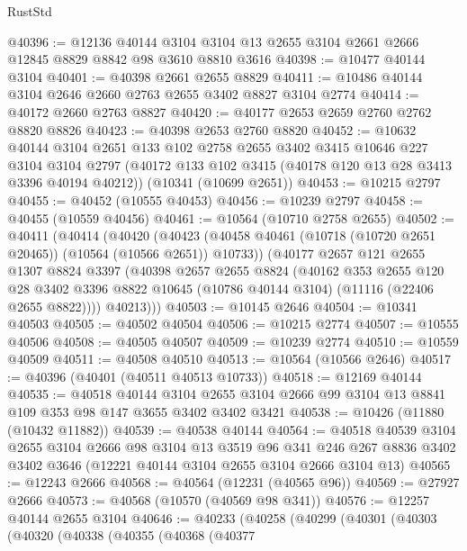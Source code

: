 \begin{lexlean}{RustStd}
\begin{coremodule}
@40396 := @12136
    @40144
    @3104
    @3104
    @13
    @2655
    @3104
    @2661
    @2666
    @12845
    @8829
    @8842
    @98
    @3610
    @8810
    @3616
@40398 := @10477 @40144 @3104
@40401 := @40398 @2661 @2655 @8829
@40411 := @10486 @40144 @3104 @2646 @2660 @2763 @2655 @3402 @8827 @3104 @2774
@40414 := @40172 @2660 @2763 @8827
@40420 := @40177 @2653 @2659 @2760 @2762 @8820 @8826
@40423 := @40398 @2653 @2760 @8820
@40452 := @10632
    @40144
    @3104
    @2651
    @133
    @102
    @2758
    @2655
    @3402
    @3415
    @10646
    @227
    @3104
    @3104
    @2797
    (@40172 @133 @102 @3415 (@40178 @120 @13 @28 @3413 @3396 @40194 @40212))
    (@10341 (@10699 @2651))
@40453 := @10215 @2797
@40455 := @40452 (@10555 @40453)
@40456 := @10239 @2797
@40458 := @40455 (@10559 @40456)
@40461 := @10564 (@10710 @2758 @2655)
@40502 := @40411
    (@40414
      (@40420
        (@40423 (@40458 @40461 (@10718 (@10720 @2651 @20465)) (@10564 (@10566 @2651)) @10733))
        (@40177
          @2657
          @121
          @2655
          @1307
          @8824
          @3397
          (@40398
            @2657
            @2655
            @8824
            (@40162
              @353
              @2655
              @120
              @28
              @3402
              @3396
              @8822
              @10645
              (@10786 @40144 @3104)
              (@11116 (@22406 @2655 @8822))))
          @40213)))
@40503 := @10145 @2646
@40504 := @10341 @40503
@40505 := @40502 @40504
@40506 := @10215 @2774
@40507 := @10555 @40506
@40508 := @40505 @40507
@40509 := @10239 @2774
@40510 := @10559 @40509
@40511 := @40508 @40510
@40513 := @10564 (@10566 @2646)
@40517 := @40396 (@40401 (@40511 @40513 @10733))
@40518 := @12169 @40144
@40535 := @40518
    @40144
    @3104
    @2655
    @3104
    @2666
    @99
    @3104
    @13
    @8841
    @109
    @353
    @98
    @147
    @3655
    @3402
    @3402
    @3421
@40538 := @10426 (@11880 (@10432 @11882))
@40539 := @40538 @40144
@40564 := @40518
    @40539
    @3104
    @2655
    @3104
    @2666
    @98
    @3104
    @13
    @3519
    @96
    @341
    @246
    @267
    @8836
    @3402
    @3402
    @3646
    (@12221 @40144 @3104 @2655 @3104 @2666 @3104 @13)
@40565 := @12243 @2666
@40568 := @40564 (@12231 (@40565 @96))
@40569 := @27927 @2666
@40573 := @40568 (@10570 (@40569 @98 @341))
@40576 := @12257 @40144 @2655 @3104
@40646 := @40233
    (@40258
      (@40299
        (@40301
          (@40303
            (@40320
              (@40338
                (@40355
                  (@40368
                    (@40377

\end{coremodule}
\end{lexlean}
